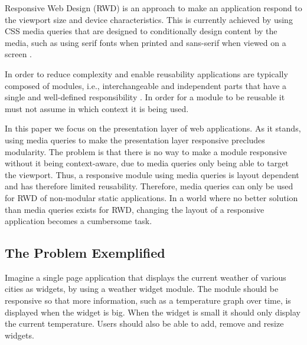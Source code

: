 \documentclass{acm_proc_article-sp}
\begin{document}
  Responsive Web Design (RWD) is an approach to make an application respond to the viewport size and device characteristics.
  This is currently achieved by using CSS media queries that are designed to conditionally design content by the media, such as using serif fonts when printed and sans-serif when viewed on a screen \cite{w3c_css_mq}.

  In order to reduce complexity and enable reusability applications are typically composed of modules, i.e., interchangeable and independent parts that have a single and well-defined responsibility \cite{parnas1972criteria}.
  In order for a module to be reusable it must not assume in which context it is being used.

  In this paper we focus on the presentation layer of web applications.
  As it stands, using media queries to make the presentation layer responsive precludes modularity.
  The problem is that there is no way to make a module responsive without it being context-aware, due to media queries only being able to target the viewport.
  Thus, a responsive module using media queries is layout dependent and has therefore limited reusability.
  Therefore, media queries can only be used for RWD of non-modular static applications.
  In a world where no better solution than media queries exists for RWD, changing the layout of a responsive application becomes a cumbersome task.

  \subsection{The Problem Exemplified}
    
    Imagine a single page application that displays the current weather of various cities as widgets, by using a weather widget module.
    The module should be responsive so that more information, such as a temperature graph over time, is displayed when the widget is big.
    When the widget is small it should only display the current temperature.
    Users should also be able to add, remove and resize widgets.
\end{document}
